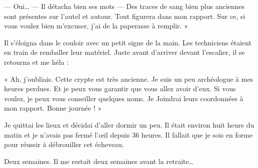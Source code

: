 — Oui… — Il détacha bien ses mots — Des traces de sang bien plus anciennes sont présentes sur l'autel et autour. Tout 
figurera dans mon rapport. Sur ce, si vous voulez bien m'excuser, j'ai de la paperasse à remplir. »

Il s'éloigna dans le couloir avec un petit signe de la main. Les techniciens étaient en train de remballer leur 
matériel. Juste avant d'arriver devant l'escalier, il se retourna et me héla :

« Ah, j'oubliais. Cette crypte est très ancienne. Je suis un peu archéologue à mes heures perdues. Et je peux vous 
garantir que vous allez avoir d'eux. Si vous voulez, je peux vous conseiller quelques noms. Je Joindrai leurs 
coordonnées à mon rapport. Bonne journée ! »

Je quittai les lieux et décidai d'aller dormir un peu. Il était environ huit heure du matin et je n'avais pas fermé 
l'œil depuis 36 heures. Il fallait que je sois en forme pour réussir à débrouiller cet écheveau.

Deux semaines. Il me restait deux semaines avant la retraite…